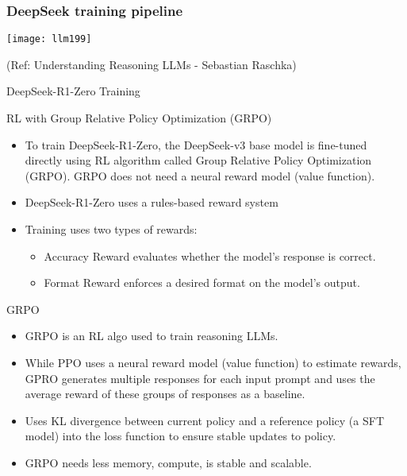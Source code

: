 \begin{frame}[fragile]\frametitle{DeepSeek training pipeline}

		\begin{center}
		\texttt{[image: llm199]}
		
		{\tiny (Ref: Understanding Reasoning LLMs - Sebastian Raschka)}
	
		\end{center}

 
\end{frame}


\begin{frame}[fragile]{DeepSeek-R1-Zero Training}

RL with Group Relative Policy Optimization (GRPO)

    \begin{itemize}
        \item  To train DeepSeek-R1-Zero, the DeepSeek-v3 base model is fine-tuned 
directly using RL algorithm called Group Relative Policy Optimization 
(GRPO). GRPO does not need a neural reward model (value function).
        \item   DeepSeek-R1-Zero uses a rules-based reward system 
		\item Training uses two types of rewards:
		    \begin{itemize}
				\item   Accuracy Reward evaluates whether the model's response is correct.
				\item   Format Reward  enforces a desired format on the model's output.  
		    \end{itemize}

    \end{itemize}
\end{frame}


\begin{frame}[fragile]{GRPO}


    \begin{itemize}
        \item   GRPO is an RL algo used to train reasoning LLMs. 
        \item   While PPO uses a neural reward model (value function) to estimate 
rewards, GPRO generates multiple responses for each input prompt and 
uses the average reward of these groups of responses as a baseline.  
        \item   Uses KL divergence between current policy and a reference policy (a 
SFT model) into the loss function to ensure stable updates to policy.
        \item   GRPO needs less memory, compute, is stable and scalable. 
    \end{itemize}
\end{frame}


